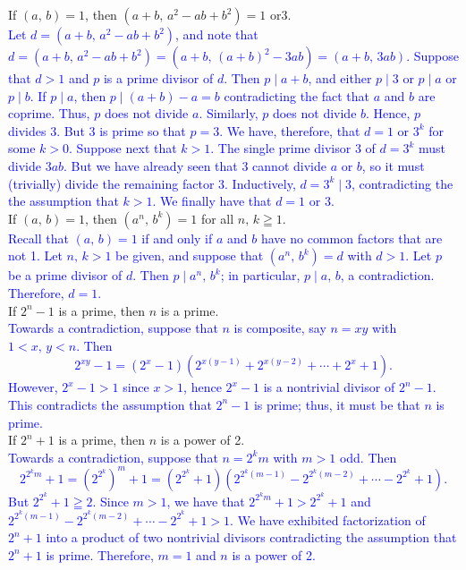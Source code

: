 \documentclass[a4paper,11pt]{article}
\theoremstyle{mythm}
\theoremstyle{mydef}
\newcommand{\blue}[1]{\textcolor{blue}{#1}}
\begin{document}
 If $(a,\,b)=1$, then $(a+b,\,a^2-ab+b^2)=1\text{ or
}3$. \\

\blue{Let $d=(a+b,\,a^2-ab+b^2)$, and note that
$d=(a+b,\,a^2-ab+b^2)=(a+b,\,(a+b)^2-3ab)=(a+b,\,3ab)$. Suppose that $d>1$ and
$p$ is a prime divisor of $d$. Then $p \mid a+b$, and either $p \mid 3$ or $p
\mid a$ or $p \mid b$. If $p \mid a$, then $p \mid (a+b)-a=b$ contradicting the
fact that $a$ and $b$ are coprime. Thus, $p$ does not divide $a$. Similarly, $p$
does not divide $b$. Hence, $p$ divides 3. But 3 is prime so that $p=3$. We
have, therefore, that $d=1 \text{ or }3^k$ for some $k>0$. Suppose next that
$k>1$. The single prime divisor 3 of $d=3^k$ must divide $3ab$. But we have
already seen that 3 cannot divide $a$ or $b$, so it must (trivially) divide the
remaining factor 3. Inductively, $d=3^k \mid 3$, contradicting the the
assumption that $k>1$. We finally have that $d=1\text{ or }3$.} \\

 If $(a,\,b)=1$, then $(a^n,\,b^k)=1$ for all $n,\,k
\geqq 1$. \\

\blue{Recall that $(a,\,b)=1$ if and only if $a$ and $b$ have no common factors
that are not 1. Let $n,\,k > 1$ be given, and suppose that $(a^n,\,b^k)=d$ with
$d > 1$. Let $p$ be a prime divisor of $d$. Then $p \mid a^n,\,b^k$; in
particular, $p \mid a,\,b$, a contradiction. Therefore, $d=1$.} \\

 If $2^n-1$ is a prime, then $n$ is a prime. \\

\blue{Towards a contradiction, suppose that $n$ is composite, say $n=xy$ with
  $1<x,\,y<n$. Then
  \[
    2^{xy}-1 = (2^x-1)(2^{x(y-1)}+2^{x(y-2)}+\cdots+2^x+1).
  \]
  However, $2^x-1 > 1$ since $x>1$, hence $2^x-1$ is a nontrivial divisor of
  $2^n-1$. This contradicts the assumption that $2^n-1$ is prime; thus, it must be
  that $n$ is prime.} \\

 If $2^n+1$ is a prime, then $n$ is a power of 2. \\

\blue{Towards a contradiction, suppose that $n=2^km$ with $m>1$ odd. Then
  \[
    2^{2^km}+1=(2^{2^k})^m+1 = (2^{2^k}+1)(2^{2^k(m-1)}-2^{2^k(m-2)}+\cdots-2^{2^k}+1).
  \]
  But $2^{2^k}+1 \geqq 2$. Since $m>1$, we have that $2^{2^km}+1 > 2^{2^k}+1$
and $2^{2^k(m-1)}-2^{2^k(m-2)}+\cdots-2^{2^k}+1 > 1$. We have exhibited
factorization of $2^n+1$ into a product of two nontrivial divisors contradicting
the assumption that $2^n+1$ is prime. Therefore, $m=1$ and $n$ is a power of 2.}
\\
\end{document}
